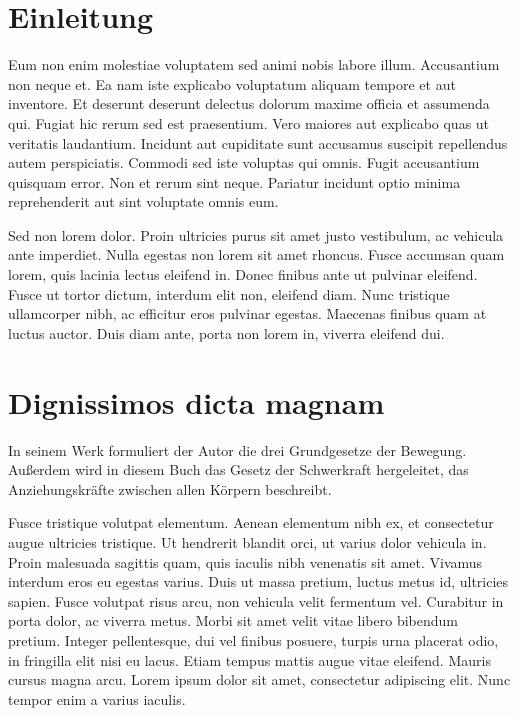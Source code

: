 \documentclass[12pt, a4paper]{article}
\begin{document}
\newpage
\pagestyle{empty}
\tableofcontents
\newpage
\pagestyle{plain}

\section{Einleitung}

Eum non enim molestiae voluptatem sed animi nobis labore illum. Accusantium non neque et. Ea nam iste explicabo voluptatum aliquam tempore et aut inventore. Et deserunt deserunt delectus dolorum maxime officia et assumenda qui. Fugiat hic rerum sed est praesentium. Vero maiores aut explicabo quas ut veritatis laudantium. Incidunt aut cupiditate sunt accusamus suscipit repellendus autem perspiciatis. Commodi sed iste voluptas qui omnis. Fugit accusantium quisquam error. Non et rerum sint neque. Pariatur incidunt optio minima reprehenderit aut sint voluptate omnis eum.

Sed non lorem dolor. Proin ultricies purus sit amet justo vestibulum, ac vehicula ante imperdiet. Nulla egestas non lorem sit amet rhoncus. Fusce accumsan quam lorem, quis lacinia lectus eleifend in. Donec finibus ante ut pulvinar eleifend. Fusce ut tortor dictum, interdum elit non, eleifend diam. Nunc tristique ullamcorper nibh, ac efficitur eros pulvinar egestas. Maecenas finibus quam at luctus auctor. Duis diam ante, porta non lorem in, viverra eleifend dui.

\section{Dignissimos dicta magnam\label{sec:kapitel_mit_abbildung}}

In seinem Werk  formuliert der Autor \citeauthor{newton1833} die drei Grundgesetze der Bewegung. Außerdem wird in diesem Buch das Gesetz der Schwerkraft hergeleitet, das Anziehungskräfte zwischen allen Körpern beschreibt.

Fusce tristique volutpat elementum. Aenean elementum nibh ex, et consectetur augue ultricies tristique. Ut hendrerit blandit orci, ut varius dolor vehicula in. Proin malesuada sagittis quam, quis iaculis nibh venenatis sit amet. Vivamus interdum eros eu egestas varius. Duis ut massa pretium, luctus metus id, ultricies sapien. Fusce volutpat risus arcu, non vehicula velit fermentum vel. Curabitur in porta dolor, ac viverra metus. Morbi sit amet velit vitae libero bibendum pretium. Integer pellentesque, dui vel finibus posuere, turpis urna placerat odio, in fringilla elit nisi eu lacus. Etiam tempus mattis augue vitae eleifend. Mauris cursus magna arcu. Lorem ipsum dolor sit amet, consectetur adipiscing elit. Nunc tempor enim a varius iaculis.
\end{document}

